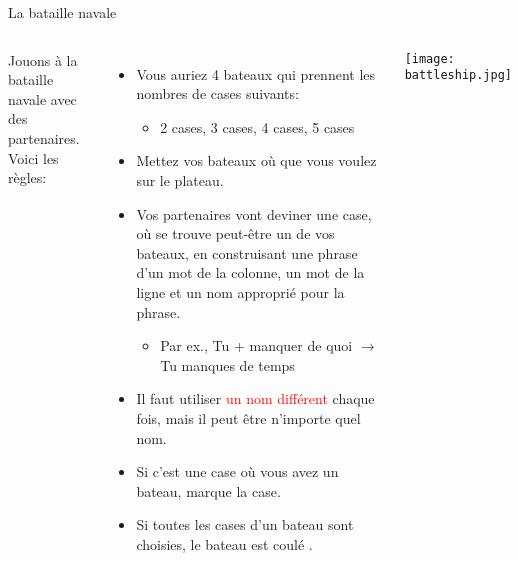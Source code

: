 \begin{frame}{La bataille navale}
  \scriptsize
    \begin{columns}
        Jouons à la bataille navale avec des partenaires.
        Voici les règles:
        \begin{itemize}
          \item Vous auriez 4 bateaux qui prennent les nombres de cases  suivants:
          \begin{itemize}
            \scriptsize
            \item 2 cases, 3 cases, 4 cases, 5 cases
          \end{itemize}
          \item Mettez vos bateaux où que  vous voulez sur le plateau.
          \item Vos partenaires vont deviner une case, où se trouve peut-être un de vos bateaux, en construisant une phrase d'un mot de la colonne, un mot de la ligne \alert{et un nom approprié pour la phrase}.
          \begin{itemize}
            \scriptsize
            \item Par ex., Tu + manquer de quoi $\to$ Tu manques de temps
          \end{itemize}
          \item Il faut utiliser \textcolor{red}{un nom différent} chaque fois, mais il peut être n'importe quel nom.
          \item Si c'est une case où vous avez un bateau, marque la case.
          \item Si toutes les cases d'un bateau sont choisies, le bateau est coulé .
          \end{itemize}
        \texttt{[image: battleship.jpg]}
    \end{columns}
\end{frame}